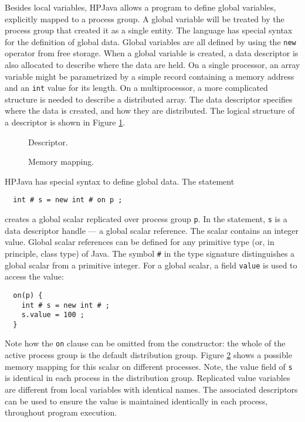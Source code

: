 Besides local variables, HPJava allows a program to define
global variables, explicitly mapped to a process group.  A
global variable will be treated by the process group that created it
as a single entity. The language has special syntax for the definition
of global data.  Global variables are all defined by using the
\texttt{new} operator from free storage.  When a global variable is
created, a
 data descriptor 
is also allocated to describe where the data are
held.  On a single processor, an array variable might be parametrized
by a simple record containing a memory address and an \texttt{int}
value for its length.  On a multiprocessor, a more complicated
structure is needed to describe a distributed array.  The data
descriptor specifies where the data is created, and how they are
distributed.  The logical structure of a descriptor is shown in Figure
\ref{fig:descriptor}.

\begin{figure}[tbp]
  \begin{center}
    \leavevmode
    \caption{Descriptor.}
    \label{fig:descriptor}
  \end{center}
\end{figure}

\begin{figure}[bp]
  \begin{center}
    \leavevmode
    \caption{Memory mapping.}
    \label{fig:mapping}
  \end{center}
\end{figure}

HPJava has special syntax to define global data.  The statement
\small
\begin{verbatim}
  int # s = new int # on p ;
\end{verbatim}
\normalsize
creates a global scalar replicated over process group {\tt p}. In the
statement, \texttt{s} is a data descriptor handle --- a
 global scalar reference.  
The scalar contains an integer value.
Global scalar references can be defined for any primitive type (or,
in principle, class type) of Java.
The symbol \texttt{\#} in the type signature
distinguishes a global scalar from a primitive integer.
For a global scalar, a field \texttt{value} is used to access the
value:
\small
\begin{verbatim}
  on(p) {
    int # s = new int # ;
    s.value = 100 ;
  }
\end{verbatim}
\normalsize
Note how the \texttt{on} clause can be omitted from the constructor:
the whole of the active process group is the default distribution group.
Figure \ref{fig:mapping} shows a possible memory mapping for this
scalar on different processes. 
Note, the value field of \texttt{s} is identical in each process in the
distribution group.   Replicated value variables are
different from local variables with identical names.  The
associated descriptors can be used to ensure the value is maintained
identically in each process, throughout program execution.

